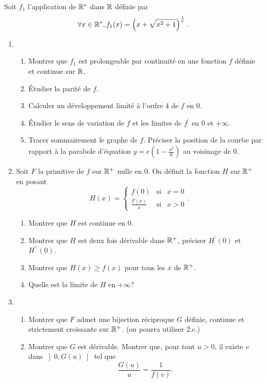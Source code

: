 Soit $f_1$ l'application de $\mathbb{R}^{*}$ dans $\mathbb{R}$ d{\'e}finie par
\[
\forall x\in \R^{*},f_1(x)=\left( x+\sqrt{x^2+1}\right) ^{\frac 1x}%
\text{.}
\]

\begin{enumerate}
\item
\begin{enumerate}
\item  Montrer que $f_{1}$ est prolongeable par continuit{\'e} en une fonction $f$ d{\'e}finie et continue sur $\mathbb{R}$.

\item  {\'E}tudier la parit{\'e} de $f$.

\item  Calculer un d{\'e}veloppement limit{\'e} {\`a} l'ordre 4 de $f$ en 0.

\item  {\'E}tudier le sens de variation de $f$ et les limites de $f^{\prime} $ en 0 et $+\infty $.

\item  Tracer sommairement le graphe de $f$. Pr{\'e}ciser la position de la courbe par rapport {\`a} la parabole d'{\'e}quation $y=e(1-\frac{x^{2}}{6})$ au voisinage de 0.
\end{enumerate}

\item  Soit $F$ la primitive de $f$ sur $\mathbb{R}^{+}$ nulle en 0. On d{\'e}finit la fonction $H$ sur $\mathbb{R}^{+}$ en posant
\[
H(x)=\left\{
\begin{array}{ccc}
f(0) & \text{si} & x=0 \\
\frac{F(x)}{x} & \text{si} & x>0
\end{array}
\right. .
\]

\begin{enumerate}
\item  Montrer que $H$ est continue en 0.

\item  Montrer que $H$ est deux fois d{\'e}rivable dans $\mathbb{R}^{+}$, pr{\'e}ciser $H^{\prime }(0)$ et $H^{\prime \prime }(0)$.

\item  Montrer que $H(x)\geq f(x)$ pour tous les $x$ de $\mathbb{R}^{+}$.

\item  Quelle est la limite de $H$ en $+\infty $?
\end{enumerate}

\item
\begin{enumerate}
\item  Montrer que $F$ admet une bijection r{\'e}ciproque $G$ d{\'e}finie, continue et strictement croissante sur $\mathbb{R}^{+}$. (on
pourra utiliser 2.c.)

\item  Montrer que $G$ est d{\'e}rivable. Montrer que, pour tout $u>0$, il existe $v$ dans $\left] 0,G(u)\right[ $ tel que
\[
\frac{G(u)}{u}=\frac{1}{f(v)}\text{.}
\]
\end{enumerate}
\end{enumerate}
